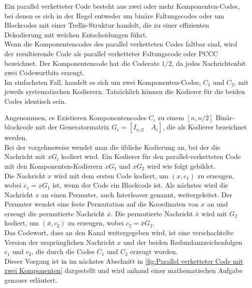 \begin{definition}
Ein parallel verketteter Code besteht aus zwei oder mehr Komponenten-Codes, 
bei denen es sich in der Regel entweder um 
binäre Faltungscodes oder um Blockcodes mit einer Trellis-Struktur handelt, 
die zu einer effizienten Dekodierung mit weichen Entscheidungen führt.\\

Wenn die
Komponentencodes des parallel verketteten Codes faltbar sind, wird der resultierende Code als parallel
verketteter Faltungscode oder PCCC bezeichnet. Der Komponentencode hat die Coderate $1/2$, da jedes Nachrichtenbit zwei Codewortbits erzeugt.\\

Im einfachsten Fall, 
handelt es sich um zwei Komponenten-Codes, $C_1$ und $C_2$, 
mit jeweils systematischen Kodierern. Tatsächlich können die Kodierer 
für die beiden Codes identisch sein. \cite[S. 8]{huffman}
\\ 
\end{definition}


\begin{Beispiel}
Angenommen, es Existieren Komponentencodes $C_i$ zu einem $[n, n/2]$ Binär-
blockcode mit der Generatormatrix $G_i$ = $[I_{n/2} \quad A_{i}]$, die als Kodierer bezeichnet werden.\\

Bei der vorgehnsweise wendet man die übliche Kodierung an, bei der die Nachricht mit
$xG_i$ kodiert wird. Ein Kodierer für den parallel-verketteten Code mit den Komponenten-Kodierern $xG_1$ und $xG_2$
wird wie folgt gebildet.\\

Die Nachricht $x$ wird mit dem ersten Code kodiert, um $(x, c_1)$ zu erzeugen, wobei $c_1 = xG_1$ ist, wenn der Code ein Blockcode ist. Als nächstes wird die Nachricht $x$ an einen Permuter, auch Interleaver genannt,
weitergeleitet. Der Permuter wendet eine feste Permutation auf die Koordinaten von $x$ an und erzeugt die permutierte Nachricht $\bar{x}$. Die permutierte Nachricht $\bar{x}$ wird mit $G_2$ kodiert, um $(\bar{x}, c_2)$ zu erzeugen, wobei $c_2 = \bar{x}G_2$.\\

Das Codewort, dass an den Kanal weitergegeben wird, ist eine verschachtelte Version der ursprünglichen Nachricht $x$ und der beiden Redundanzzeichenfolgen $c_1$ und $c_2$, die durch die Codes $C_1$ und $C_2$ erzeugt
wurden.\\

Dieser Vorgang ist in im nächstes Abschnitt in
\autoref{fig:Parallel verketteter Code mit zwei Komponenten} dargestellt und wird anhand einer mathematischen Aufgabe genauer erläutert.\\
\end{Beispiel}
\pagebreak

